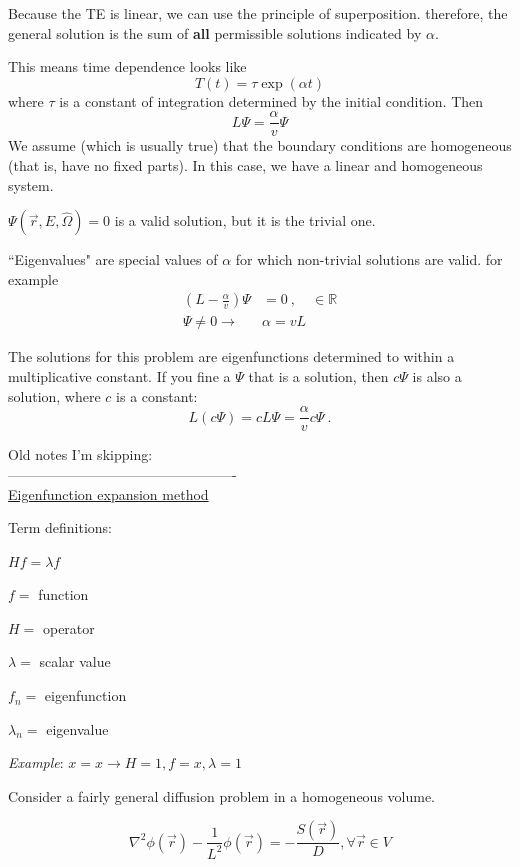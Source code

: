 \documentclass[12pt]{article}
\newcommand{\rvec}{\ensuremath{\vec{r}}}
\newcommand{\vecr}{\ensuremath{\vec{r}}}
\newcommand{\vOmega}{\ensuremath{\hat{\Omega}}}
\begin{document}
Because the TE is linear, we can use the principle of superposition. 
therefore, the general solution is the sum of \textbf{all} permissible solutions indicated by $\alpha$.

This means time dependence looks like
\[ T(t) = \tau \exp(\alpha t)\]
where $\tau$ is a constant of integration determined by the initial condition.
Then
\[L\Psi = \frac{\alpha}{v}\Psi\]
%
We assume (which is usually true) that the boundary conditions are homogeneous (that is, have no fixed parts).
In this case, we have a linear and homogeneous system.

$\Psi(\rvec, E, \vOmega) = 0$ is a valid solution, but it is the trivial one.

``Eigenvalues" are special values of $\alpha$ for which non-trivial solutions are valid.
for example
\begin{align*}
(L - \frac{\alpha}{v})\Psi &= 0 \:, \quad \in \mathbb{R} \\
\Psi \neq 0 \rightarrow \: &\alpha = v L
\end{align*}

The solutions for this problem are eigenfunctions determined to within a multiplicative constant.
If you fine a $\Psi$ that is a solution, then $c \Psi$ is also a solution, where $c$ is a constant:
\[L(c \Psi) = cL \Psi = \frac{\alpha}{v}c \Psi \:.\]


\clearpage
Old notes I'm skipping:\\
-------------------------------------------------\\
\underline{Eigenfunction expansion method}

Term definitions:

$Hf = \lambda f$

$f =$ function

$H =$ operator

$\lambda =$ scalar value

$f_n =$ eigenfunction

$\lambda_n =$ eigenvalue


\emph{Example}: $x = x \rightarrow H = 1, f = x, \lambda = 1$ 

Consider a fairly general diffusion problem in a homogeneous volume.

\begin{equation*}
\nabla^2\phi(\vecr) - \frac{1}{L^2}\phi(\vecr) = -\frac{S(\rvec)}{D}, \forall \rvec \in V
\end{equation*}
\end{document}
